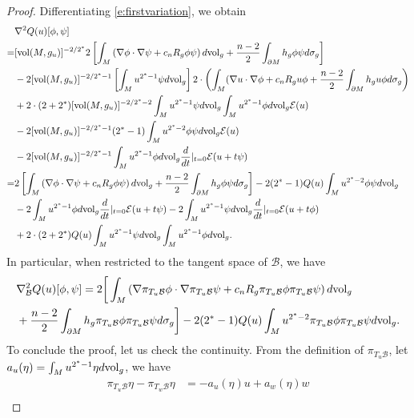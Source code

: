 \documentclass[12pt]{amsart}
\newcommand{\na}{{\nabla}}
\newcommand{\B}{\mathcal{B}}
\newcommand{\vol}{{\rm{vol}}}
\begin{document}
\begin{proof}
	Differentiating \eqref{e:firstvariation}, we obtain
   \begin{align}
       &\nabla^2Q(u)[\phi,\psi]\\
       =& [\vol(M, g_{u})]^{-2/2^*}2\left[\int_M \left(\na \phi \cdot \na \psi +c_n R_g\phi \psi  \right)d\vol_g +\frac{n-2}{2}\int_{\partial M}h_g\phi \psi d\sigma_g    \right] \notag \\
       &-2[\vol(M, g_{u})]^{-2/2^*-1}\left[\int_M u^{2^*-1}\psi d\vol_g  \right]2\cdot\left(\int_M(\na u \cdot \na \phi +c_nR_g u \phi +\frac{n-2}{2}\int_{\partial M}h_g u \phi d\sigma_g \right) \notag \\
       &+2\cdot(2+2^*)[\vol(M, g_{u})]^{-2/2^*-2}\int_M u^{2^*-1}\psi d\vol_g\int_M u^{2^*-1}\phi d\vol_g \mathcal E(u)\notag \\
       &-2[\vol(M, g_{u})]^{-2/2^*-1}(2^*-1)\int_M u^{2^*-2} \phi \psi d\vol_g \mathcal E(u) \notag \\
       &-2[\vol(M, g_{u})]^{-2/2^*-1}\int_M u^{2^*-1} \phi d\vol_g \frac{d}{dt}\large|_{t=0} \mathcal E(u+t\psi) \notag \\
       =&2\left[\int_M \left(\na \phi \cdot \na \psi +c_n R_g\phi \psi  \right)d\vol_g +\frac{n-2}{2}\int_{\partial M}h_g\phi \psi d\sigma_g    \right] -2(2^*-1)Q(u)\int_Mu^{2^*-2}\phi \psi d\vol_g \notag \\
       &-2\int_M u^{2^*-1} \phi d\vol_g \frac{d}{dt}\large|_{t=0} \mathcal E(u+t\psi)-2\int_M u^{2^*-1} \psi d\vol_g \frac{d}{dt}\large|_{t=0} \mathcal E(u+t\phi)\notag \\
       &+2\cdot (2+2^*) Q(u) \int_M u^{2^*-1}\psi d\vol_g\int_M u^{2^*-1}\phi d\vol_g. \notag 
   \end{align}
   In particular, when restricted to the tangent space of $\B$, we have
   \begin{align}
       &\nabla_\B^2Q(u)[\phi,\psi]=2\bigg[\int_M \left(\na \pi_{T_u\B}\phi \cdot \na \pi_{T_u\B}\psi +c_n R_g\pi_{T_u\B}\phi \pi_{T_u\B}\psi  \right)d\vol_g\\
       &+\frac{n-2}{2}\int_{\partial M}h_g\pi_{T_u\B}\phi \pi_{T_u\B}\psi d\sigma_g\bigg]
       -2(2^*-1)Q(u)\int_Mu^{2^*-2}\pi_{T_u\B}\phi \pi_{T_u\B}\psi d\vol_g. \notag
   \end{align}
   To conclude the proof, let us check the continuity. From the definition of $\pi_{T_u{\B}}$, let $a_u(\eta)= \int_M u^{2^* -1} \eta d \vol_g$, we have 
   \begin{align*}
       \pi_{T_u{\B}} \eta -\pi_{T_w{\B}} \eta &= -a_u(\eta)u +a_w(\eta) w\\

\end{align*}
\end{proof}
\end{document}
